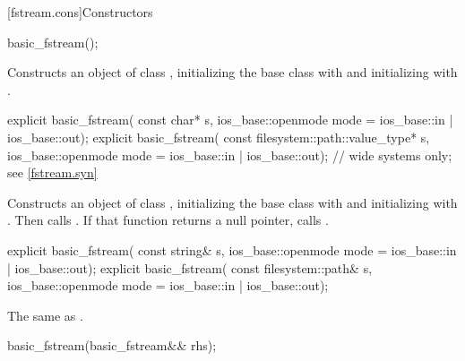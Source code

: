 [fstream.cons]{Constructors}

%
\begin{itemdecl}
basic_fstream();
\end{itemdecl}

\begin{itemdescr}
\pnum
\effects
Constructs an object of class
,
initializing the base class with
and initializing
with
.
\end{itemdescr}

%
\begin{itemdecl}
explicit basic_fstream(
  const char* s,
  ios_base::openmode mode = ios_base::in | ios_base::out);
explicit basic_fstream(
  const filesystem::path::value_type* s,
  ios_base::openmode mode = ios_base::in | ios_base::out);  // wide systems only; see \ref{fstream.syn}
\end{itemdecl}

\begin{itemdescr}
\pnum
\effects
Constructs an object of class
,
initializing the base class with
and initializing
with
.
Then calls
.
If that function returns a null pointer, calls
.
\end{itemdescr}

%
\begin{itemdecl}
explicit basic_fstream(
  const string& s,
  ios_base::openmode mode = ios_base::in | ios_base::out);
explicit basic_fstream(
  const filesystem::path& s,
  ios_base::openmode mode = ios_base::in | ios_base::out);
\end{itemdecl}

\begin{itemdescr}
\pnum
\effects The same as .
\end{itemdescr}

%
\begin{itemdecl}
basic_fstream(basic_fstream&& rhs);
\end{itemdecl}

